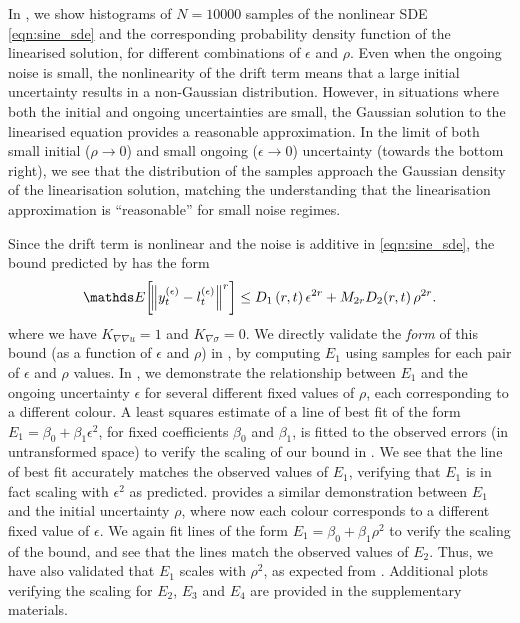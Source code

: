In , we show histograms of \(N = 10000\) samples of the nonlinear SDE \eqref{eqn:sine_sde} and the corresponding probability density function of the linearised solution, for different combinations of \(\epsilon\) and \(\rho\).
Even when the ongoing noise is small, the nonlinearity of the drift term means that a large initial uncertainty results in a non-Gaussian distribution.
However, in situations where both the initial and ongoing uncertainties are small, the Gaussian solution to the linearised equation provides a reasonable approximation. %
In the limit of both small initial (\(\rho \to 0\)) and small ongoing (\(\epsilon \to 0\)) uncertainty (towards the bottom right), we see that the distribution of the samples approach the Gaussian density of the linearisation solution, matching the understanding that the linearisation approximation is ``reasonable'' for small noise regimes.

Since the drift term is nonlinear and the noise is additive in \eqref{eqn:sine_sde}, the bound predicted by  has the form
\[
	\avg{\norm{y_t^{(\epsilon)} - l_t^{(\epsilon)}}^r} \leq D_1\left(r, t\right)\epsilon^{2r} + M_{2r}D_2\!\left(r,t\right)\rho^{2r}.
\]
where we have \(K_{\nabla\nabla u} = 1\) and \(K_{\nabla\sigma} = 0\).
We directly validate the \emph{form} of this bound (as a function of \(\epsilon\) and \(\rho\)) in , by computing \(E_1\) using samples for each pair of \(\epsilon\) and \(\rho\) values.
In , we demonstrate the relationship between \(E_1\) and the ongoing uncertainty \(\epsilon\) for several different fixed values of \(\rho\), each corresponding to a different colour.
A least squares estimate of a line of best fit of the form \(E_1 = \beta_0 + \beta_1 \epsilon^2 \), for fixed coefficients \(\beta_0\) and \(\beta_1\), is fitted to the observed errors (in untransformed space) to verify the scaling of our bound in .
We see that the line of best fit accurately matches the observed values of \(E_1\), verifying that \(E_1\) is in fact scaling with \(\epsilon^2\) as predicted.
 provides a similar demonstration between \(E_1\) and the initial uncertainty \(\rho\), where now each colour corresponds to a different fixed value of \(\epsilon\).
We again fit lines of the form \(E_1 = \beta_0 + \beta_1 \rho^2\) to verify the scaling of the bound, and see that the lines match the observed values of \(E_2\).
Thus, we have also validated that \(E_1\) scales with \(\rho^2\), as expected from .
Additional plots verifying the scaling for \(E_2\), \(E_3\) and \(E_4\) are provided in the supplementary materials.

